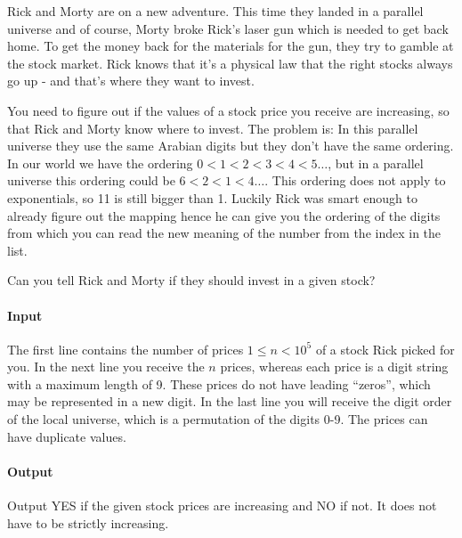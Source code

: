 



\makeheader

Rick and Morty are on a new adventure. This time they landed in a parallel universe and of course, Morty broke Rick's laser gun which is needed to get back home. To get the money back for the materials for the gun, they try to gamble at the stock market. Rick knows that it's a physical law that the right stocks always go up - and that's where they want to invest.

You need to figure out if the values of a stock price you receive are increasing, so that Rick and Morty know where to invest. The problem is: In this parallel universe they use the same Arabian digits but they don't have the same ordering. In our world we have the ordering $0 < 1 < 2 < 3 < 4 < 5 \dots$, but in a parallel universe this ordering could be $6 < 2 < 1 < 4 \dots$. This ordering does not apply to exponentials, so 11 is still bigger than 1. Luckily Rick was smart enough to already figure out the mapping hence he can give you the ordering of the digits from which you can read the new meaning of the number from the index in the list.

Can you tell Rick and Morty if they should invest in a given stock?

\paragraph*{Input}

The first line contains the number of prices $1\leq n<10^5$ of a stock Rick picked for you. In the next line you receive the $n$ prices, whereas each price is a digit string with a maximum length of 9. These prices do not have leading ``zeros'', which may be represented in a new digit. In the last line you will receive the digit order of the local universe, which is a permutation of the digits 0-9. The prices can have duplicate values.

\paragraph*{Output}

Output YES if the given stock prices are increasing and NO if not. It does not have to be strictly increasing.

\begin{samples}
\end{samples}



